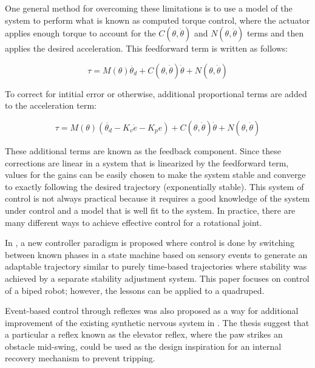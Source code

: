 One general method for overcoming these limitations is to use a model of the 
system to perform what is known as computed torque control, where the actuator
applies enough torque to account for the $C(\theta, \dot{\theta})$ and
$N(\theta, \dot{\theta})$ terms and then applies the desired acceleration. This feedforward term is written as follows:

\begin{equation}
\tau = M(\theta) \ddot{\theta_{d}} + C(\theta, \dot{\theta}) \dot{\theta} + N(\theta, \dot{\theta})
\end{equation}

To correct for intitial error or otherwise, additional proportional terms are
added to the acceleration term:

\begin{equation}
\tau = M(\theta) (\ddot{\theta_{d}} - K_{v} \dot{e} - K_{p} e) + C(\theta, \dot{\theta}) \dot{\theta} + N(\theta, \dot{\theta})
\end{equation}

These additional terms are known as the feedback component. Since these 
corrections are linear in a system that is linearized by the feedforward term,
values for the gains can be easily chosen to make the system stable and converge
to exactly following the desired trajectory (exponentially stable). This system 
of control is not always practical because it requires a good knowledge of the 
system under control and a model that is well fit to the system. In practice, 
there are many different ways to achieve effective control for a rotational 
joint.


In \cite{EventBasedWalking}, a new controller paradigm is proposed where control
is done by switching between known phases in a state machine based on sensory
events to generate an adaptable trajectory similar to purely time-based
trajectories where stability was achieved by a separate stability adjustment
system. This paper focuses on control of a biped robot; however, the lessons can
be applied to a quadruped.

Event-based control through reflexes was also proposed as a way for additional
improvement of the existing synthetic nervous system in \cite{HuntPhDThesis}.
The thesis suggest that a particular a reflex known as the elevator reflex,
where the paw strikes an
obstacle mid-swing, could be used as the design inspiration for an internal recovery
mechanism to prevent tripping.

